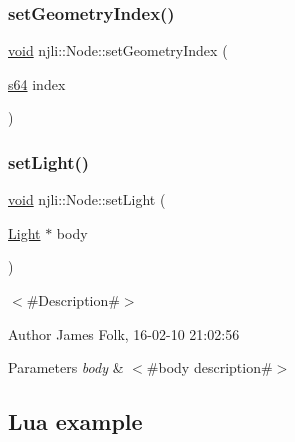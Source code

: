 \begin{DoxyCodeInclude}
\end{DoxyCodeInclude}
\mbox{\label{classnjli_1_1_node_ab3dd16a4322896c94bc1a398e3466163}} 
\subsubsection{\texorpdfstring{set\+Geometry\+Index()}{setGeometryIndex()}}
{\footnotesize\ttfamily \mbox{\hyperlink{_thread_8h_af1e856da2e658414cb2456cb6f7ebc66}{void}} njli\+::\+Node\+::set\+Geometry\+Index (\begin{DoxyParamCaption}\item[{\mbox{\hyperlink{_util_8h_a4258bfb2c3a440d06c4aaa3c2b450dde}{s64}}}]{index }\end{DoxyParamCaption})\hspace{0.3cm}{\ttfamily [protected]}}

\mbox{\label{classnjli_1_1_node_ac6e2774c5d66ba8ee450f810a172138d}} 
\subsubsection{\texorpdfstring{set\+Light()}{setLight()}}
{\footnotesize\ttfamily \mbox{\hyperlink{_thread_8h_af1e856da2e658414cb2456cb6f7ebc66}{void}} njli\+::\+Node\+::set\+Light (\begin{DoxyParamCaption}\item[{\mbox{\hyperlink{classnjli_1_1_light}{Light}} $\ast$}]{body }\end{DoxyParamCaption})}



$<$\#\+Description\#$>$ 

\begin{DoxyAuthor}{Author}
James Folk, 16-\/02-\/10 21\+:02\+:56
\end{DoxyAuthor}

\begin{DoxyParams}{Parameters}
{\em body} & $<$\#body description\#$>$\\
\hline
\end{DoxyParams}
\hypertarget{classnjli_1_1_steering_behavior_wander_ex1}{}\subsection{Lua example}\label{classnjli_1_1_steering_behavior_wander_ex1}

